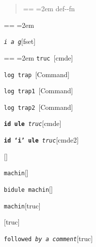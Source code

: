 \documentclass{book}
\makeatletter
\newcommand\GNUTexinfocommandstyletextvar[1]{{\normalfont{}\textsl{#1}}}%
\newenvironment{GNUTexinfopreformatted}{%
  \par\obeylines\obeyspaces\frenchspacing
  \parskip=\z@\parindent=\z@}{}
\makeatother
\begin{document}
%
\begin{quote}
\unskip{\parskip=0pt\noindent}%
\begin{GNUTexinfopreformatted}
\leftskip=2em\relax\ttfamily%
def{-}{-}fn
\end{GNUTexinfopreformatted}
\end{quote}
\begin{GNUTexinfopreformatted}
\leftskip=2em\relax\ttfamily%

\end{GNUTexinfopreformatted}
\noindent\texttt{\GNUTexinfocommandstyletextvar{i} \EmbracOn{}\textnormal{\textsl{a g}}\EmbracOff{}}\hfill[fset]

\index[fn]{i@\texttt{\GNUTexinfocommandstyletextvar{i}}}%
\begin{GNUTexinfopreformatted}
\leftskip=2em\relax\ttfamily%
%
\end{GNUTexinfopreformatted}
\noindent\texttt{truc \EmbracOn{}\textnormal{\textsl{}}\EmbracOff{}}\hfill[cmde]

%
\noindent\texttt{log trap \EmbracOn{}\textnormal{\textsl{}}\EmbracOff{}}\hfill[Command]

%
\noindent\texttt{log trap1 \EmbracOn{}\textnormal{\textsl{}}\EmbracOff{}}\hfill[Command]

%
\noindent\texttt{log trap2 \EmbracOn{}\textnormal{\textsl{}}\EmbracOff{}}\hfill[Command]

%
\noindent\texttt{\textbf{id ule} \EmbracOn{}\textnormal{\textsl{truc}}\EmbracOff{}}\hfill[cmde]

%
\noindent\texttt{\textbf{id `\texttt{i}' ule} \EmbracOn{}\textnormal{\textsl{truc}}\EmbracOff{}}\hfill[cmde2]

%
\noindent\texttt{}\hfill[]

\noindent\texttt{machin}\hfill[]

%
\noindent\texttt{bidule machin}\hfill[]

%
\noindent\texttt{machin}\hfill[truc]

%
\noindent\texttt{}\hfill[truc]

\noindent\texttt{followed \EmbracOn{}\textnormal{\textsl{by a comment}}\EmbracOff{}}\hfill[truc]
\end{document}
